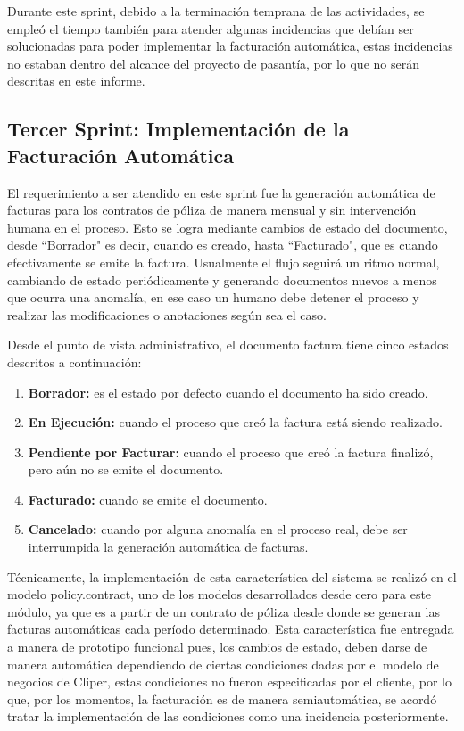 \documentclass[a4paper, 12pt]{article}
\begin{document}
Durante este sprint, debido a la terminación temprana de las actividades, se empleó el tiempo también para atender algunas incidencias que debían ser solucionadas para poder implementar la facturación automática, estas incidencias no estaban dentro del alcance del proyecto de pasantía, por lo que no serán descritas en este informe.

\subsection{Tercer Sprint: Implementación de la Facturación Automática}
El requerimiento a ser atendido en este sprint fue la generación automática de facturas para los contratos de póliza de manera mensual y sin intervención humana en el proceso. Esto se logra mediante cambios de estado del documento, desde ``Borrador" es decir, cuando es creado, hasta ``Facturado", que es cuando efectivamente se emite la factura. Usualmente el flujo seguirá un ritmo normal, cambiando de estado periódicamente y generando documentos nuevos a menos que ocurra una anomalía, en ese caso un humano debe detener el proceso y realizar las modificaciones o anotaciones según sea el caso.

Desde el punto de vista administrativo, el documento factura tiene cinco estados descritos a continuación:
\begin{enumerate}
    \item \textbf{Borrador:} es el estado por defecto cuando el documento ha sido creado.
    \item \textbf{En Ejecución:} cuando el proceso que creó la factura está siendo realizado.
    \item \textbf{Pendiente por Facturar:} cuando el proceso que creó la factura finalizó, pero aún no se emite el documento.
    \item \textbf{Facturado:} cuando se emite el documento.
    \item \textbf{Cancelado:} cuando por alguna anomalía en el proceso real, debe ser interrumpida la generación automática de facturas.
\end{enumerate}
Técnicamente, la implementación de esta característica del sistema se realizó en el modelo policy.contract, uno de los modelos desarrollados desde cero para este módulo, ya que es a partir de un contrato de póliza desde donde se generan las facturas automáticas cada período determinado. Esta característica fue entregada a manera de prototipo funcional pues, los cambios de estado, deben darse de manera automática dependiendo de ciertas condiciones dadas por el modelo de negocios de Cliper, estas condiciones no fueron especificadas por el cliente, por lo que, por los momentos, la facturación es de manera semiautomática, se acordó tratar la implementación de las condiciones como una incidencia posteriormente.
\end{document}
